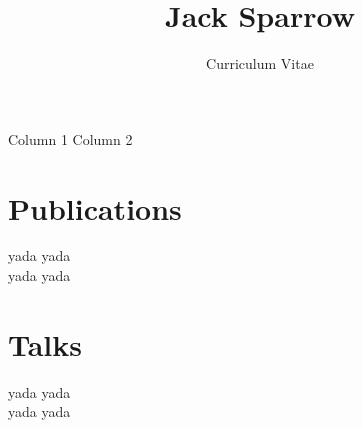 \documentclass[twocolumn]{article}
\title{Jack Sparrow}
\author{Curriculum Vitae}
\date{}
\begin{document}
\maketitle
\thispagestyle{empty}

\vspace{1cm}



\vspace{1cm}


\begin{multicols}{2}
Column 1
\columnbreak
Column 2
\end{multicols}

\begin{minipage}[t]{0.55\textwidth}

\section*{Publications}
yada yada \\
yada yada
\vspace{2em}
\end{minipage}\hfill

\begin{minipage}[t]{0.4\textwidth}
\section*{Talks}
yada yada \\
yada yada
\end{minipage}


\vspace{2em}



\end{document}
